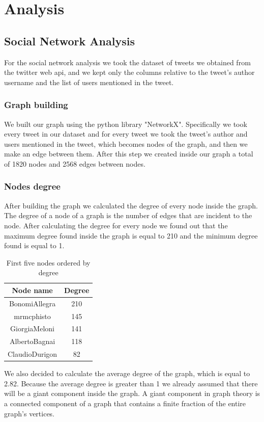 \documentclass[12pt,journal,compsoc]{IEEEtran}
\begin{document}
\section{Analysis}
\subsection{Social Network Analysis}
For the social network analysis we took the dataset of tweets we obtained from the twitter web api, and we kept only the columns relative to the tweet's author username and the list of users mentioned in the tweet. 
\subsubsection{Graph building}
We built our graph using the python library "NetworkX\cite{NetworkX}". Specifically we took every tweet in our dataset and for every tweet we took the tweet's author and users mentioned in the tweet, which becomes nodes of the graph, and then we make an edge between them. After this step we created inside our graph a total of 1820 nodes and 2568 edges between nodes.

\subsubsection{Nodes degree}
After building the graph we calculated the degree of every node inside the graph. The degree of a node of a graph is the number of edges that are incident to the node. After calculating the degree for every node we found out that the maximum degree found inside the graph is equal to 210 and the minimum degree found is equal to 1. 
\begin{table}[ht]
\centering
\begin{tabular}{c c }
	Node name & Degree  \\
	\hline
	BonomiAllegra & 210  \\
	mrmcphisto & 145  \\
	GiorgiaMeloni & 141  \\
	AlbertoBagnai & 118  \\
	ClaudioDurigon & 82  \\
\end{tabular}
\caption{First five nodes ordered by degree}
\end{table}
We also decided to calculate the average degree of the graph, which is equal to 2.82. Because the average degree is greater than 1 we already assumed that there will be a giant component inside the graph. A giant component in graph theory is a connected component of a graph that contains a finite fraction of the entire graph's vertices.
\end{document}

